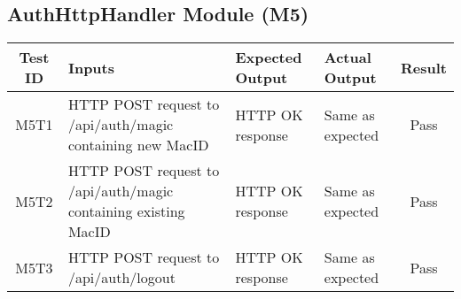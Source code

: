 \documentclass[fullpage]{article}
\begin{document}
\subsection{AuthHttpHandler Module (M5)}
\begin{table}[H]
\flushleft
\begin{tabular}{|c|p{4.5cm}|p{3.6cm}|p{3.6cm}|c|}
\hline
 \rowcolor{lightgray} 
\textbf{Test ID} &\textbf{Inputs} &\textbf{Expected Output} &\textbf{Actual Output} &\textbf{Result}\\
\hline
M5T1 & HTTP POST request to /api/auth/magic containing new MacID & HTTP OK response & Same as expected & Pass \\
\hline
M5T2 & HTTP POST request to /api/auth/magic containing existing MacID & HTTP OK response & Same as expected & Pass \\
\hline
M5T3 & HTTP POST request to /api/auth/logout & HTTP OK response & Same as expected & Pass \\
\hline
\end{tabular}
\end{table}
\end{document}

